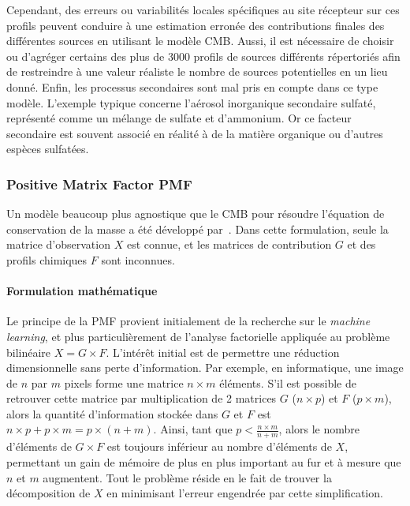 Cependant, des erreurs ou variabilités locales spécifiques au site récepteur sur ces
profils peuvent conduire à une estimation erronée des contributions finales des
différentes sources en utilisant le modèle CMB.
Aussi, il est nécessaire de choisir ou d'agréger certains des plus de 3000 profils de sources
différents répertoriés afin de restreindre à une valeur réaliste le nombre de sources
potentielles en un lieu donné.
Enfin, les processus secondaires sont mal pris en compte dans ce type modèle. L'exemple typique
concerne l'aérosol inorganique secondaire sulfaté, représenté comme un mélange de sulfate
et d'ammonium. Or ce facteur secondaire est souvent associé en réalité à de la matière
organique ou d'autres espèces sulfatées.

\subsubsection{Positive Matrix Factor PMF}%
\label{ssub:pmf}

Un modèle beaucoup plus agnostique que le CMB pour résoudre l'équation de conservation de
la masse a été développé par~\cite{paateroPositive1994}. Dans cette formulation,
seule la matrice d'observation $X$ est connue, et les matrices de contribution $G$ et des
profils chimiques $F$ sont inconnues.

\paragraph{Formulation mathématique}%
\label{par:formulation_mathématique}

Le principe de la PMF provient initialement de la recherche sur le \textit{machine
learning}, et plus particulièrement de l'analyse factorielle appliquée au problème
bilinéaire $X=G\times F$. L'intérêt initial est de permettre une réduction
dimensionnelle sans perte d'information. Par exemple, en informatique, une image de $n$
par $m$ pixels forme une matrice $n\times m$ éléments. S'il est possible de retrouver
cette matrice par multiplication de 2 matrices $G$ ($n\times p$) et $F$ ($p \times m$),
alors la quantité d'information stockée dans $G$ et $F$ est $n
\times p + p \times m = p \times (n + m)$. Ainsi, tant que $p < \frac{n\times m}{n+m}$,
alors le nombre d'éléments de $G\times F$ est toujours inférieur au nombre d'éléments de
$X$, permettant un gain de mémoire de plus en plus important au fur et à mesure que $n$ et
$m$ augmentent.
Tout le problème réside en le fait de trouver la décomposition de $X$ en minimisant
l'erreur engendrée par cette simplification.

